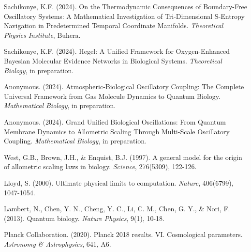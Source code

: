 \documentclass[12pt,a4paper]{article}
\begin{document}
\begin{thebibliography}{99}

Sachikonye, K.F. (2024). On the Thermodynamic Consequences of Boundary-Free Oscillatory Systems: A Mathematical Investigation of Tri-Dimensional S-Entropy Navigation in Predetermined Temporal Coordinate Manifolds. \textit{Theoretical Physics Institute}, Buhera.

Sachikonye, K.F. (2024). Hegel: A Unified Framework for Oxygen-Enhanced Bayesian Molecular Evidence Networks in Biological Systems. \textit{Theoretical Biology}, in preparation.

Anonymous. (2024). Atmospheric-Biological Oscillatory Coupling: The Complete Universal Framework from Gas Molecule Dynamics to Quantum Biology. \textit{Mathematical Biology}, in preparation.

Anonymous. (2024). Grand Unified Biological Oscillations: From Quantum Membrane Dynamics to Allometric Scaling Through Multi-Scale Oscillatory Coupling. \textit{Mathematical Biology}, in preparation.

West, G.B., Brown, J.H., \& Enquist, B.J. (1997). A general model for the origin of allometric scaling laws in biology. \textit{Science}, 276(5309), 122-126.

Lloyd, S. (2000). Ultimate physical limits to computation. \textit{Nature}, 406(6799), 1047-1054.

Lambert, N., Chen, Y. N., Cheng, Y. C., Li, C. M., Chen, G. Y., \& Nori, F. (2013). Quantum biology. \textit{Nature Physics}, 9(1), 10-18.

Planck Collaboration. (2020). Planck 2018 results. VI. Cosmological parameters. \textit{Astronomy \& Astrophysics}, 641, A6.

\end{thebibliography}
\end{document}

